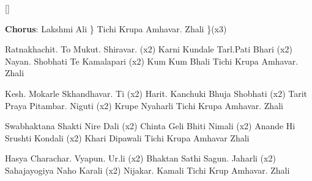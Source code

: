 
\chordsoff

[]
    
    \beginchorus
        {\bf Chorus}:
        Lakshmi Ali \}
        Tichi Krupa Amhavar. Zhali \}(x3)
    \endchorus
        
    \beginverse
        Ratnakhachit. To Mukut. Shiravar. (x2)
        Karni Kundale Tarl.Pati Bhari (x2)
        Nayan. Shobhati Te Kamalapari (x2)
        Kum Kum Bhali Tichi Krupa Amhavar. Zhali
    \endverse
    
        
    \beginverse
        Kesh. Mokarle Skhandhavar. Ti (x2)
        Harit. Kanchuki Bhuja Shobhati (x2)
        Tarit Praya Pitambar. Niguti (x2)
        Krupe Nyaharli Tichi Krupa Amhavar. Zhali
    \endverse

    \beginverse        
        Swabhaktana Shakti Nire Dali (x2)
        Chinta Geli Bhiti Nimali (x2)
        Anande Hi Srushti Kondali (x2)
        Khari Dipawali Tichi Krupa Amhavar Zhali
    \endverse
    
        
    
    \beginverse    
        Hasya Charachar. Vyapun. Ur.li (x2)
        Bhaktan Sathi Sagun. Jaharli (x2)
        Sahajayogiya Naho Karali (x2)
        Nijakar. Kamali Tichi Krup Amhavar. Zhali
    \endverse
    
\endsong

\newpage